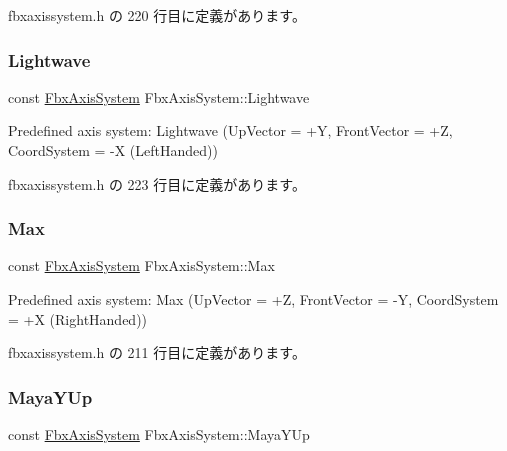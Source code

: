  fbxaxissystem.\+h の 220 行目に定義があります。

\mbox{\label{class_fbx_axis_system_a45fc90ee125c8dafa7ca95f62e7485a8}} 
\subsubsection{\texorpdfstring{Lightwave}{Lightwave}}
{\footnotesize\ttfamily const \hyperlink{class_fbx_axis_system}{Fbx\+Axis\+System} Fbx\+Axis\+System\+::\+Lightwave\hspace{0.3cm}{\ttfamily [static]}}



Predefined axis system\+: Lightwave (Up\+Vector = +Y, Front\+Vector = +Z, Coord\+System = -\/X (Left\+Handed)) 



 fbxaxissystem.\+h の 223 行目に定義があります。

\mbox{\label{class_fbx_axis_system_a3ac2db6cd471f8477a1d0b4a3ad22608}} 
\subsubsection{\texorpdfstring{Max}{Max}}
{\footnotesize\ttfamily const \hyperlink{class_fbx_axis_system}{Fbx\+Axis\+System} Fbx\+Axis\+System\+::\+Max\hspace{0.3cm}{\ttfamily [static]}}



Predefined axis system\+: Max (Up\+Vector = +Z, Front\+Vector = -\/Y, Coord\+System = +X (Right\+Handed)) 



 fbxaxissystem.\+h の 211 行目に定義があります。

\mbox{\label{class_fbx_axis_system_a898f6952538dbc23cead05b2a1e19d10}} 
\subsubsection{\texorpdfstring{Maya\+Y\+Up}{MayaYUp}}
{\footnotesize\ttfamily const \hyperlink{class_fbx_axis_system}{Fbx\+Axis\+System} Fbx\+Axis\+System\+::\+Maya\+Y\+Up\hspace{0.3cm}{\ttfamily [static]}}



